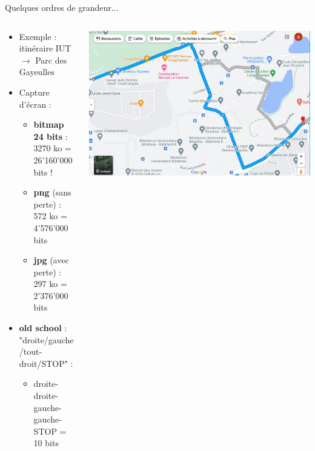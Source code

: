 \documentclass[9pt, aspectratio=169]{beamer}
\begin{document}
\begin{frame}{Quelques ordres de grandeur...} %
\begin{columns}
   \begin{column}{0.6\textwidth}
   \begin{itemize}
       \item Exemple : itinéraire IUT $\rightarrow$ Parc des Gayeulles
       \item Capture d'écran :
            \begin{itemize}
            \item \textbf{bitmap 24 bits} : 3270 ko = 26'160'000 bits !
            \item \textbf{png} (sans perte) : 572 ko = 4'576'000 bits‬
            \item \textbf{jpg} (avec perte) : 297 ko = 2'376'000 bits
            \end{itemize}
        \item \textbf{old school} : "droite/gauche/tout-droit/STOP" :
            \begin{itemize}
            \item droite-droite-gauche-gauche-STOP = 10 bits
            \end{itemize}
   \end{itemize}
		
   \end{column}
   \begin{column}{0.39\textwidth}
		\includegraphics[width=\textwidth]{fig/maps_iut_gayeulles.jpg}
   \end{column}
\end{columns}
\end{frame}
\end{document}
